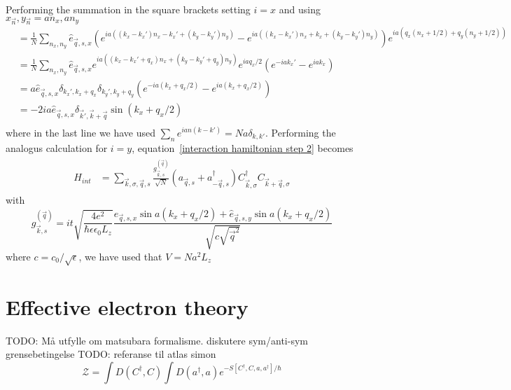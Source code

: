 \documentclass{article}
\begin{document}
Performing the summation in the square brackets setting $i = x$ and using $x_{\vec{n}},y_{\vec{n}} = a n_x, a n_y$
\begin{align*}
    [...] &= \frac{1}{N}\sum_{n_x, n_y} \hat{e}_{\vec{q},s,x} ( e^{i a\left((k_x - k_x') n_x - k_x' + (k_y - k_y') n_y \right)} -  e^{i a\left((k_x - k_x') n_x + k_x + (k_y - k_y') n_y \right)}) e^{i a \left(q_x \left(n_x + 1/2\right) + q_y (n_y + 1/2)\right)}\\
          &= \frac{1}{N}\sum_{n_x, n_y} \hat{e}_{\vec{q},s,x} e^{i a\left((k_x - k_x' + q_x) n_x + (k_y - k_y' + q_y) n_y \right)} e^{ia q_x / 2} ( e^{- i a k_x' } -  e^{i a k_x })\\
          &= a \hat{e}_{\vec{q},s,x} \delta_{k_x',k_x + q_x} \delta_{k_y',k_y + q_y}  ( e^{- i a (k_x + q_x /2) } -  e^{i a (k_x + q_x/2)  })\\
          &=   -2 i a \hat{e}_{\vec{q},s,x} \delta_{\vec{k}',\vec{k} + \vec{q}} \sin(k_x + q_x /2)\\
\end{align*}
where in the last line we have used $\sum_n e^{ian(k - k')} = N a \delta_{k,k'}$. Performing the analogus calculation for $i = y$, equation~\cref{interaction hamiltonian step 2} becomes
\begin{align}
\begin{split}
    H_{int} &=  \sum_{\vec{k},\sigma,\vec{q},s} \frac{g_{\vec{k},s}^{(\vec{q})}}{\sqrt{N}} \left(a_{\vec{q},s} + a_{-\vec{q}, s}^{\dagger}\right) C_{\vec{k},\sigma}^{\dagger} C_{\vec{k} + \vec{q},\sigma} 
    \end{split}
\end{align}
with 
\begin{equation}
   g_{\vec{k},s}^{(\vec{q})} = i t \sqrt{\frac{4 e^2}{\hbar \epsilon \epsilon_0 L_z}} \frac{\hat{e}_{\vec{q},s,x} \sin{a(k_x + q_x /2)} + \hat{e}_{\vec{q},s,y} \sin{a(k_x + q_x /2)}}{\sqrt{c \sqrt{\vec{q}^2}}}
\end{equation}
where $c = c_0 / \sqrt{\epsilon}$, we have used that $V = N a^2 L_z$


\section{Effective electron theory}
TODO: Må utfylle om matsubara formalisme. diskutere sym/anti-sym grensebetingelse
TODO: referanse til atlas simon
\begin{equation}
    \mathcal{Z} = \int D(C^{\dagger}, C) \int D(a^{\dagger}, a) e^{-S[C^{\dagger},C,a,a^{\dagger}] / \hbar}
    \label{path integral}
\end{equation}
\end{document}
